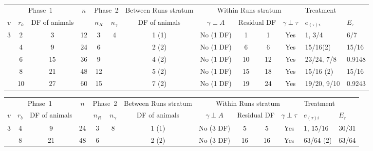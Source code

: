 \documentclass[a4paper,11pt]{article}
\begin{document}
\begin{landscape}
\begin{tabular}[t]{|c|c|c|c|c|c|c|c|c|c|c|p{1in}|p{0.4in}|} \hline
\multicolumn{3}{|c|}{Phase~1}  & $n$  & \multicolumn{2}{c|}{Phase~2} & Between Runs stratum  & \multicolumn{4}{c|}{Within Runs stratum} & \multicolumn{2}{p{1.4in}|}{Treatment} \\ \cline{1-3} \cline{5-6}\cline{7-13}
$v$ & $r_b$ & DF of animals &  & $n_R$ & $n_\gamma$ & DF of animals &  $\gamma \perp A$ & \multicolumn{2}{c|}{Residual DF} & $\gamma \perp \tau$ & $e_{(\tau)i}$ &$E_\tau$\\ \hline
3 & 2 & 3 & 12 & 3 & 4 & 1 (1)  & No (1 DF) & 1 & 1 & Yes & 1,  3/4 & 6/7 \\ \hline 
 & 4 & 9 & 24 & 6 &  & 2 (2) & No (1 DF) & 6 & 6 & Yes & 15/16(2) & 15/16 \\ \hline 
 & 6 & 15 & 36 & 9 &  & 4 (2) & No (1 DF) & 10 & 12 & Yes & 23/24,   7/8 & 0.9148 \\ \hline 
 & 8 & 21 & 48 & 12 &  & 5 (2) & No (1 DF) & 15 & 18 & Yes & 15/16 (2) & 15/16 \\ \hline 
 & 10 & 27 & 60 & 15 &  & 7 (2) & No (1 DF) & 19 & 24 & Yes & 19/20,  9/10 & 0.9243 \\ \hline 
\end{tabular}




\begin{tabular}[t]{|c|c|c|c|c|c|c|c|c|c|c|p{1in}|p{0.4in}|} \hline
\multicolumn{3}{|c|}{Phase~1}  & $n$  & \multicolumn{2}{c|}{Phase~2} & Between Runs stratum  & \multicolumn{4}{c|}{Within Runs stratum} & \multicolumn{2}{p{1.4in}|}{Treatment} \\ \cline{1-3} \cline{5-6}\cline{7-13}
$v$ & $r_b$ & DF of animals &  & $n_R$ & $n_\gamma$ & DF of animals &  $\gamma \perp A$ & \multicolumn{2}{c|}{Residual DF} & $\gamma \perp \tau$ & $e_{(\tau)i}$ &$E_\tau$\\ \hline
3 & 4 & 9 & 24 & 3 & 8 & 1 (1) & No (3 DF) & 5 & 5 & Yes & 1, 15/16 & 30/31 \\ \hline 
 & 8 & 21 & 48 & 6 &  & 2 (2) & No (3 DF) & 16 & 16 & Yes & 63/64 (2) & 63/64 \\ \hline 
\end{tabular}



\end{landscape}
\end{document}

